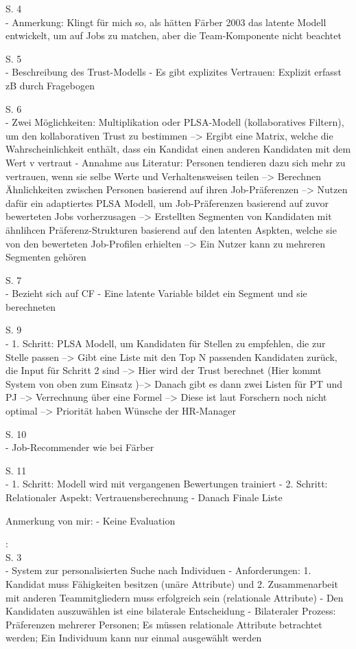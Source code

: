 S. 4\\
- Anmerkung: Klingt für mich so, als hätten Färber 2003 das latente Modell entwickelt, um auf Jobs zu matchen, aber die Team-Komponente nicht beachtet

S. 5\\
- Beschreibung des Trust-Modells
- Es gibt explizites Vertrauen: Explizit erfasst zB durch Fragebogen

S. 6\\
- Zwei Möglichkeiten: Multiplikation oder PLSA-Modell (kollaboratives Filtern), um den kollaborativen Trust zu bestimmen --> Ergibt eine Matrix, welche die Wahrscheinlichkeit enthält, dass ein Kandidat einen anderen Kandidaten mit dem Wert v vertraut
- Annahme aus Literatur: Personen tendieren dazu sich mehr zu vertrauen, wenn sie selbe Werte und Verhaltensweisen teilen --> Berechnen Ähnlichkeiten zwischen Personen basierend auf ihren Job-Präferenzen --> Nutzen dafür ein adaptiertes PLSA Modell, um Job-Präferenzen basierend auf zuvor bewerteten Jobs vorherzusagen --> Erstellten Segmenten von Kandidaten mit ähnlihcen Präferenz-Strukturen basierend auf den latenten Aspkten, welche sie von den bewerteten Job-Profilen erhielten --> Ein Nutzer kann zu mehreren Segmenten gehören

S. 7\\
- Bezieht sich auf CF
- Eine latente Variable bildet ein Segment und sie berechneten

S. 9\\
- 1. Schritt: PLSA Modell, um Kandidaten für Stellen zu empfehlen, die zur Stelle passen --> Gibt eine Liste mit den Top N passenden Kandidaten zurück, die Input für Schritt 2 sind --> Hier wird der Trust berechnet (Hier kommt System von oben zum Einsatz )--> Danach gibt es dann zwei Listen für PT und PJ --> Verrechnung über eine Formel --> Diese ist laut Forschern noch nicht optimal --> Priorität haben Wünsche der HR-Manager

S. 10\\
- Job-Recommender wie bei Färber

S. 11\\
- 1. Schritt: Modell wird mit vergangenen Bewertungen trainiert
- 2. Schritt: Relationaler Aspekt: Vertrauensberechnung
- Danach Finale Liste

Anmerkung von mir:
- Keine Evaluation

\textcite{keim:2005}:\\
S. 3\\
- System zur personalisierten Suche nach Individuen
- Anforderungen: 1. Kandidat muss Fähigkeiten besitzen (unäre Attribute) und 2. Zusammenarbeit mit anderen Teammitgliedern muss erfolgreich sein (relationale Attribute)
- Den Kandidaten auszuwählen ist eine bilaterale Entscheidung
- Bilateraler Prozess: Präferenzen mehrerer Personen; Es müssen relationale Attribute betrachtet werden; Ein Individuum kann nur einmal ausgewählt werden

